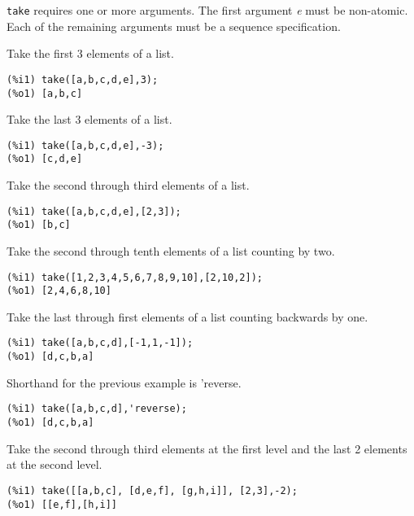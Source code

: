 \documentclass[]{article}
\begin{document}
\vspace{5 pt}

   {\tt take} requires one or more arguments. The first argument {\it e} must be non-atomic.
   Each of the remaining arguments must be a sequence specification.


\vspace{5 pt}


   Take the first 3 elements of a list. 

\begin{Verbatim}[frame=single]
(%i1) take([a,b,c,d,e],3);
(%o1) [a,b,c]
\end{Verbatim}

   Take the last 3 elements of a list. 

\begin{Verbatim}[frame=single]
(%i1) take([a,b,c,d,e],-3);
(%o1) [c,d,e]
\end{Verbatim}

   Take the second through third elements of a list. 

\begin{Verbatim}[frame=single]
(%i1) take([a,b,c,d,e],[2,3]);
(%o1) [b,c]
\end{Verbatim}

   Take the second through tenth elements of a list counting by two. 

\begin{Verbatim}[frame=single]
(%i1) take([1,2,3,4,5,6,7,8,9,10],[2,10,2]);
(%o1) [2,4,6,8,10]
\end{Verbatim}

   Take the last through first elements of a list counting backwards by one. 

\begin{Verbatim}[frame=single]
(%i1) take([a,b,c,d],[-1,1,-1]);
(%o1) [d,c,b,a]
\end{Verbatim}

   Shorthand for the previous example is 'reverse. 

\begin{Verbatim}[frame=single]
(%i1) take([a,b,c,d],'reverse);
(%o1) [d,c,b,a]
\end{Verbatim}

   Take the second through third elements at the first level and the last 2 
   elements at the second level. 

\begin{Verbatim}[frame=single]
(%i1) take([[a,b,c], [d,e,f], [g,h,i]], [2,3],-2);
(%o1) [[e,f],[h,i]]
\end{Verbatim}
\end{document}
